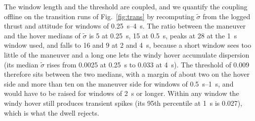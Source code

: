 \documentclass{ieeeaccess}
\begin{document}
The window length and the threshold are coupled, and we quantify the coupling
offline on the transition runs of Fig.~\ref{fig:trans} by recomputing
$\tilde\sigma$ from the logged thrust and attitude for windows of
\SIrange{0.25}{4}{\second}. The ratio between the maneuver and the hover medians
of $\tilde\sigma$ is \num{5} at \SI{0.25}{\second}, \num{15} at
\SI{0.5}{\second}, peaks at \num{28} at the \SI{1}{\second} window used, and
falls to \num{16} and \num{9} at \SI{2}{} and \SI{4}{\second}, because a short
window sees too little of the maneuver and a long one lets the windy hover
accumulate dispersion (its median $\tilde\sigma$ rises from \num{0.0025} at
\SI{0.25}{\second} to \num{0.033} at \SI{4}{\second}). The threshold of
\num{0.009} therefore sits between the two medians, with a margin of about two
on the hover side and more than ten on the maneuver side for windows of
\SIrange{0.5}{1}{\second}, and would
have to be raised for windows of \SI{2}{\second} or longer. Within any window the
windy hover still produces transient spikes (its 95th percentile at
\SI{1}{\second} is \num{0.027}), which is what the dwell rejects.
\end{document}
